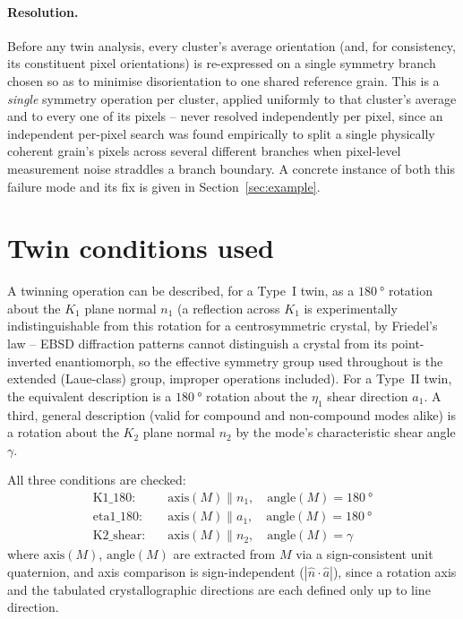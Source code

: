 \documentclass[11pt]{article}
\newcommand{\Kone}{K_1}
\newcommand{\Ktwo}{K_2}
\newcommand{\etaone}{\eta_1}
\begin{document}
\paragraph{Resolution.} Before any twin analysis, every cluster's
average orientation (and, for consistency, its constituent pixel
orientations) is re-expressed on a single symmetry branch chosen so as to
minimise disorientation to one shared reference grain. This is a
\emph{single} symmetry operation per cluster, applied uniformly to that
cluster's average and to every one of its pixels -- never resolved
independently per pixel, since an independent per-pixel search was found
empirically to split a single physically coherent grain's pixels across
several different branches when pixel-level measurement noise straddles
a branch boundary. A concrete instance of both this failure mode and its
fix is given in Section~\ref{sec:example}.

\section{Twin conditions used}

A twinning operation can be described, for a Type~I twin, as a
$\SI{180}{\degree}$ rotation about the $\Kone$ plane normal $n_1$
(a reflection across $\Kone$ is experimentally indistinguishable from
this rotation for a centrosymmetric crystal, by Friedel's law -- EBSD
diffraction patterns cannot distinguish a crystal from its point-inverted
enantiomorph, so the effective symmetry group used throughout is the
extended (Laue-class) group, improper operations included). For a
Type~II twin, the equivalent description is a $\SI{180}{\degree}$
rotation about the $\etaone$ shear direction $a_1$. A third, general
description (valid for compound and non-compound modes alike) is a
rotation about the $\Ktwo$ plane normal $n_2$ by the mode's
characteristic shear angle $\gamma$.

All three conditions are checked:
\begin{align}
  \text{K1\_180:}\quad & \text{axis}(M) \parallel n_1, \quad \text{angle}(M) = \SI{180}{\degree} \\
  \text{eta1\_180:}\quad & \text{axis}(M) \parallel a_1, \quad \text{angle}(M) = \SI{180}{\degree} \\
  \text{K2\_shear:}\quad & \text{axis}(M) \parallel n_2, \quad \text{angle}(M) = \gamma
\end{align}
where $\text{axis}(M)$, $\text{angle}(M)$ are extracted from $M$ via a
sign-consistent unit quaternion, and axis comparison is sign-independent
($|\hat n \cdot \hat a|$), since a rotation axis and the tabulated
crystallographic directions are each defined only up to line direction.
\end{document}

